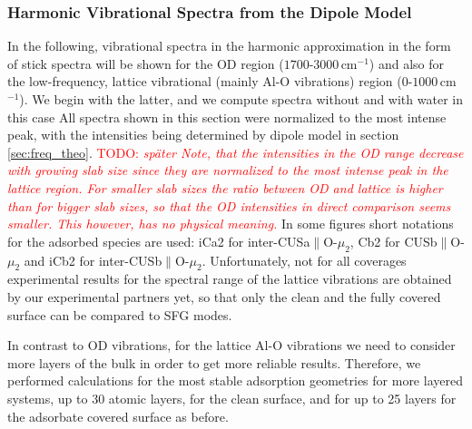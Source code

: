 \documentclass[11pt,DIV=13,BCOR=5mm,a4paper,headinclude]{scrbook}
\newcommand\todo[1]{\textcolor{red}{TODO: \textit{{#1}}}}
\begin{document}
\subsubsection{Harmonic Vibrational Spectra from the Dipole Model}\label{phonons}

In the following, vibrational spectra in the harmonic approximation in the form of stick spectra will be shown for the OD region ($1700$-$3000\,$cm$^{-1}$) and also for the low-frequency, lattice vibrational (mainly Al-O vibrations) region ($0$-$1000\,$cm$^{-1}$).
We begin with the latter, and we compute spectra without and with water in this case
All spectra shown in this section were normalized to the most intense peak, with the intensities being determined by dipole model in section \ref{sec:freq_theo}.
\todo{später Note, that the intensities in the OD range decrease with growing slab size since they are normalized to the most intense peak in the lattice region.
For smaller slab sizes the ratio between OD and lattice is higher than for bigger slab sizes, so that the OD intensities in direct comparison seems smaller.
This however, has no physical meaning.}
In some figures short notations for the adsorbed species are used: iCa2 for inter-CUSa$\parallel$O-$\mu_2$, Cb2 for CUSb$\parallel$O-$\mu_2$ and iCb2 for inter-CUSb$\parallel$O-$\mu_2$.
Unfortunately, not for all coverages experimental results for the spectral range of the lattice vibrations are obtained by our experimental partners yet, so that only the clean and the fully covered surface can be compared to SFG modes.


In contrast to OD vibrations, for the lattice Al-O vibrations we need to consider more layers of the bulk in order to get more reliable results.
Therefore, we performed calculations for the most stable adsorption geometries for more layered systems, up to $30$ atomic layers, for the clean surface, and for up to 25 layers for the adsorbate covered surface as before.
\end{document}
